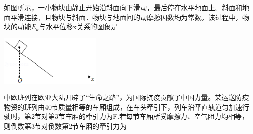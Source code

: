 \newpage
\question[6] 如图所示，一小物块由静止开始沿斜面向下滑动，最后停在水平地面上。斜面和地面平滑连接，且物块与斜面、物块与地面间的动摩擦因数均为常数。该过程中，物块的动能$E_k$与水平位移x关系的图象是
\begin{center}\includegraphics[width=5cm]{img/image3.png}\end{center}
\begin{solution}{4cm}

\end{solution}



\question[6] 中欧班列在欧亚大陆开辟了“生命之路”，为国际抗疫贡献了中国力量。某运送防疫物资的班列由40节质量相等的车厢组成，在车头牵引下，列车沿平直轨道匀加速行驶时，第2节对第3节车厢的牵引力为F.若每节车厢所受摩擦力、空气阻力均相等，则倒数第3节对倒数第2节车厢的牵引力为
\begin{solution}{4cm}

\end{solution}

